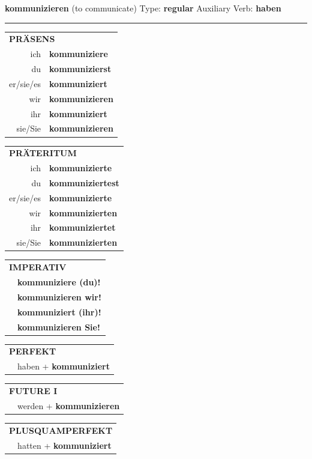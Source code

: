 \documentclass[10pt,a4paper]{revtex4-2}
\begin{document}
\begin{verbbox}
{\Large \bf kommunizieren} (to communicate) \hfill Type: \textbf{regular} \hfill Auxiliary Verb: \textbf{haben} 

\vspace{5pt}
\hrule
\vspace{5pt}

\begin{tabular}{rl}
\multicolumn{2}{l}{\textbf{PRÄSENS}}\\
ich & \textbf{kommuniziere}\\
du & \textbf{kommunizierst}\\
er/sie/es & \textbf{kommuniziert}\\
wir & \textbf{kommunizieren}\\
ihr & \textbf{kommuniziert}\\
sie/Sie & \textbf{kommunizieren}\\
\end{tabular}
\hfill
\begin{tabular}{rl}
\multicolumn{2}{l}{\textbf{PRÄTERITUM}}\\
ich & \textbf{kommunizierte}\\
du & \textbf{kommuniziertest}\\
er/sie/es & \textbf{kommunizierte}\\
wir & \textbf{kommunizierten}\\
ihr & \textbf{kommuniziertet}\\
sie/Sie & \textbf{kommunizierten}\\
\end{tabular}
\hfill
\begin{tabular}{rl}
\multicolumn{2}{l}{\textbf{IMPERATIV}}\\
& \textbf{kommuniziere (du)!}\\
& \textbf{kommunizieren wir!}\\
& \textbf{kommuniziert (ihr)!}\\
& \textbf{kommunizieren Sie!}\\
\end{tabular}

\vspace{10pt}

\begin{tabular}{rl}
\multicolumn{2}{l}{\textbf{PERFEKT}}\\
& haben + \textbf{kommuniziert}\\
\end{tabular}
\hfill
\begin{tabular}{rl}
\multicolumn{2}{l}{\textbf{FUTURE I}}\\
& werden + \textbf{kommunizieren}\\
\end{tabular}
\hfill
\begin{tabular}{rl}
\multicolumn{2}{l}{\textbf{PLUSQUAMPERFEKT}}\\
& hatten + \textbf{kommuniziert}\\
\end{tabular}


\end{verbbox}
\end{document}
